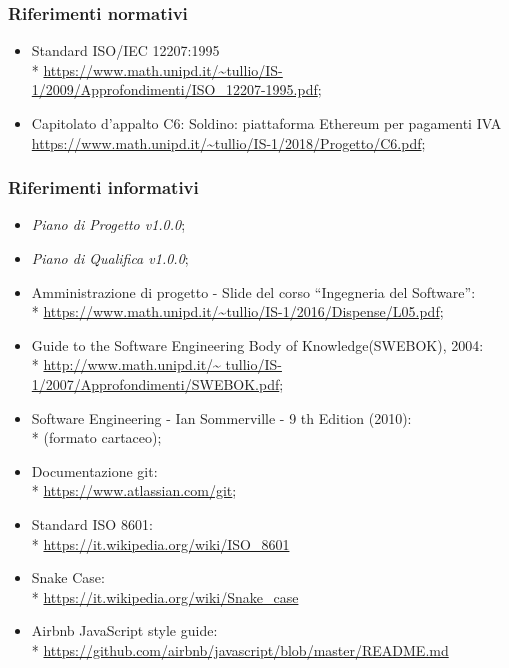 \subsubsection{Riferimenti normativi}
\begin{itemize}
	\item Standard ISO/IEC 12207:1995 \\* 
		\url{https://www.math.unipd.it/~tullio/IS-1/2009/Approfondimenti/ISO_12207-1995.pdf};
	\item Capitolato d'appalto C6: Soldino: piattaforma Ethereum per pagamenti IVA \\
		\url{https://www.math.unipd.it/~tullio/IS-1/2018/Progetto/C6.pdf};
\end{itemize}

\subsubsection{Riferimenti informativi}
\begin{itemize}
	\item \textit{Piano di Progetto v1.0.0};
	\item \textit{Piano di Qualifica v1.0.0};
	\item Amministrazione di progetto - Slide del corso “Ingegneria del
		Software”: \\*
		\url{https://www.math.unipd.it/~tullio/IS-1/2016/Dispense/L05.pdf};
	\item Guide to the Software Engineering Body of Knowledge(SWEBOK), 2004: \\*
		\url{http://www.math.unipd.it/~	tullio/IS-1/2007/Approfondimenti/SWEBOK.pdf};
	\item Software Engineering - Ian Sommerville - 9 th Edition (2010): \\*
		(formato cartaceo);
	\item Documentazione git: \\*
		\url{https://www.atlassian.com/git};
	\item Standard ISO 8601: \\*
		\url{https://it.wikipedia.org/wiki/ISO_8601}
	\item Snake Case\glo: \\*
		\url{https://it.wikipedia.org/wiki/Snake_case}
	\item Airbnb JavaScript style guide: \\*
		\url{https://github.com/airbnb/javascript/blob/master/README.md}
		
	
\end{itemize}
